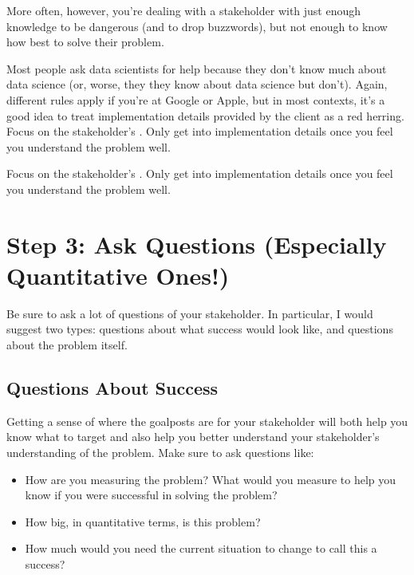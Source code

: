 \documentclass[letterpaper,10pt,english]{jupyterBook}
\begin{document}
\sphinxAtStartPar
More often, however, you’re dealing with a stakeholder with just enough knowledge to be dangerous (and to drop buzzwords), but not enough to know how best to solve their problem.

\sphinxAtStartPar
Most people ask data scientists for help because they don’t know much about data science (or, worse, they  they know about data science but don’t). Again, different rules apply if you’re at Google or Apple, but in most contexts, it’s a good idea to treat implementation details provided by the client as a red herring. Focus on the stakeholder’s . Only get into implementation details once you feel you understand the problem well.

\begin{sphinxShadowBox}

\sphinxAtStartPar
Focus on the stakeholder’s . Only get into implementation details once you feel you understand the problem well.
\end{sphinxShadowBox}


\section{Step 3: Ask Questions (Especially Quantitative Ones!)}
\label{\detokenize{20_problems_to_questions/20_stakeholder_management:step-3-ask-questions-especially-quantitative-ones}}
\sphinxAtStartPar
Be sure to ask a lot of questions of your stakeholder. In particular, I would suggest two types: questions about what success would look like, and questions about the problem itself.


\subsection{Questions About Success}
\label{\detokenize{20_problems_to_questions/20_stakeholder_management:questions-about-success}}
\sphinxAtStartPar
Getting a sense of where the goalposts are for your stakeholder will both help you know what to target and also help you better understand your stakeholder’s understanding of the problem. Make sure to ask questions like:
\begin{itemize}
\item {} 
\sphinxAtStartPar
How are you measuring the problem? What would you measure to help you know if you were successful in solving the problem?

\item {} 
\sphinxAtStartPar
How big, in quantitative terms, is this problem?

\item {} 
\sphinxAtStartPar
How much would you need the current situation to change to call this a success?

\end{itemize}
\end{document}
